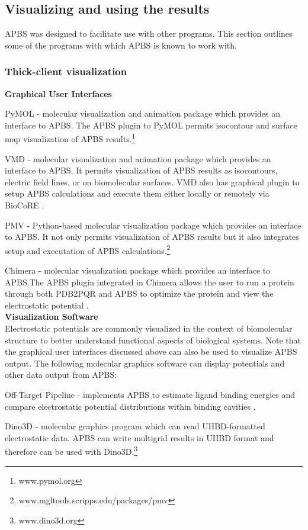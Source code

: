 \documentclass[journal=jpcbfk, manuscript=article]{achemso}
\begin{document}
\subsection{Visualizing and using the results}
APBS was designed to facilitate use with other programs. This section outlines some of the programs with which APBS is known to work with. 

\subsubsection{Thick-client visualization}
%
\textbf{Graphical User Interfaces} 

PyMOL - molecular visualization and animation package which provides an interface to APBS. The APBS plugin to PyMOL permits isocontour and surface map visualization of APBS results.\footnote{www.pymol.org}

VMD - molecular visualization and animation package which provides an interface to APBS. It permits visualization of APBS results as isocontours, electric field lines, or on biomolecular surfaces. VMD also has graphical plugin to setup APBS calculations and execute them either locally or remotely via BioCoRE \cite{humphrey1996}. 

PMV - Python-based molecular visualization package which provides an interface to APBS. It not only permits visualization of APBS results but it also integrates setup and executation of APBS calculations.\footnote{www.mgltools.scripps.edu/packages/pmv}

Chimera - molecular visualization package which provides an interface to APBS.The APBS plugin integrated in Chimera allows the user to run a protein through both PDB2PQR and APBS to optimize the protein and view the electrostatic potential \cite{pettersen2004}. \\
%
\textbf{Visualization Software} \\
Electrostatic potentials are commonly visualized in the context of biomolecular structure to better understand functional aspects of biological systems. Note that the graphical user interfaces discussed above can also be used to visualize APBS output. The following molecular graphics software can display potentials and other data output from APBS:

Off-Target Pipeline - implements APBS to estimate ligand binding energies and compare electrostatic potential distributions within binding cavities \cite{evangelidis2012}.

Dino3D - molecular graphics program which can read UHBD-formatted electrostatic data. APBS can write multigrid results in UHBD format and therefore can be used with Dino3D.\footnote{www.dino3d.org}
\end{document}
